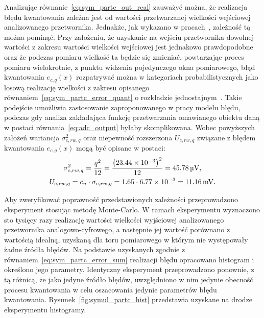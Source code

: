 Analizując równanie~\eqref{eq:sym_partc_out_real} zauważyć można, że realizacja błędu kwantowania zależna jest od wartości przetwarzanej wielkości wejściowej analizowanego przetwornika. Jednakże, jak wykazano w pracach~\cite{sienkowski_kwant, sienkowski_adc}, zależność tą można pominąć. Przy założeniu, że uzyskanie na wejściu przetwornika dowolnej wartości z zakresu wartości wielkości wejściowej jest jednakowo prawdopodobne oraz że podczas pomiaru wielkość ta będzie się zmieniać, powtarzając proces pomiaru wielokrotnie, z punktu widzenia pojedynczego okna pomiarowego, błąd kwantowania $e_{c,q}(x)$ rozpatrywać można w kategoriach probabilistycznych jako losową realizację wielkości z zakresu opisanego równaniem~\eqref{eq:sym_partc_error_quant} o rozkładzie jednostajnym~\cite{jakubiec_system}. Takie podejście umożliwia zastosowanie zaproponowanego w pracy modelu błędu, podczas gdy analiza zakładająca funkcję przetwarzania omawianego obiektu daną w postaci równania~\eqref{eq:adc_output} byłaby skomplikowana. Wobec powyższych założeń wariancja $\sigma_{c,rw,q}^{2}$ oraz niepewność rozszerzona $U_{c,rw,q}$ związane z błędem kwantowania $e_{c,q}(x)$ mogą być opisane w postaci:
\begin{gather}
\sigma_{c,rw,q}^{2} = \frac{ q^{2}}{12} = \frac{\left(\num{23.44e-3}\right)^{2} }{12} = \qty{45.78}{\micro V} \label{eq:sym_partc_var_quant}, \\
U_{c,rw,q} = c_{u} \cdot \sigma_{c,rw,q} = 1.65 \cdot \num{6.77e-3} = \qty{11.16}{mV} \label{eq:sym_partc_uncert_quant}.
\end{gather}

Aby zweryfikować poprawność przedstawionych zależności przeprowadzono eksperyment stosując metodę Monte-Carlo. W ramach eksperymentu wyznaczono sto tysięcy razy realizację wartości wielkości wyjściowej analizowanego przetwornika analogowo-cyfrowego, a następnie jej wartość porównano z wartością idealną, uzyskaną dla toru pomiarowego w którym nie występowały żadne źródła błędów. Na podstawie uzyskanych zgodnie z równaniem~\eqref{eq:sym_partc_error_sum} realizacji błędu opracowano histogram i określono jego parametry. Identyczny eksperyment przeprowadzono ponownie, z tą różnicą, że jako jedyne źródło błędów, uwzględniono w nim jedynie obecność procesu kwantowania w celu oszacowania jedynie parametrów błędu kwantowania. Rysunek~\ref{fig:symul_partc_hist} przedstawia uzyskane na drodze eksperymentu histogramy.

